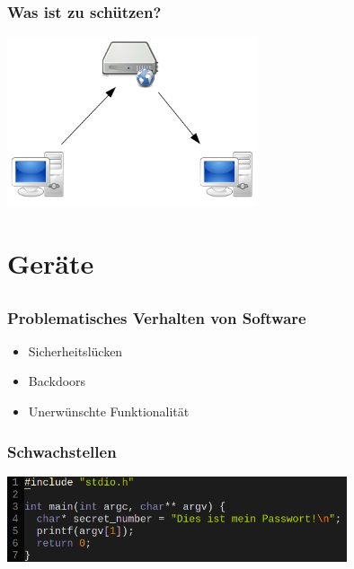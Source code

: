 \documentclass[12pt, xcolor={svgnames,table}]{beamer}
\begin{document}
\begin{frame}
    \frametitle{Was ist zu schützen?}
    \begin{center}
      \includegraphics[height=5cm]{img/c-s.png}
    \end{center}
\end{frame}

\section{Geräte}
\subsection{}

\begin{frame}
  \frametitle{Problematisches Verhalten von Software}
  \begin{itemize}
    \item<2-> Sicherheitslücken
    \item<3-> Backdoors
    \item<4-> Unerwünschte Funktionalität
  \end{itemize}
\end{frame}

\begin{frame}
  \frametitle{Schwachstellen}
  \begin{center}
    \includegraphics[width=10cm]{img/formatstring.png}
  \par\end{center}
\end{frame}
\end{document}
